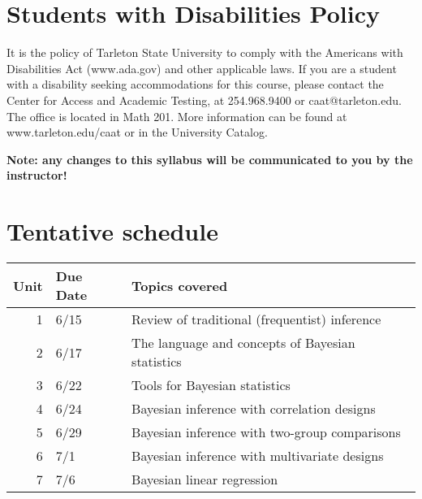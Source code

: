 \documentclass[10pt]{article}
\begin{document}
\section*{Students with Disabilities Policy}
\label{sec:orga1238df}

It is the policy of Tarleton State University to comply with the Americans with Disabilities  Act (www.ada.gov) and other applicable laws.  If you are a student with a disability seeking accommodations for this course, please contact the Center for Access and Academic Testing, at 254.968.9400 or caat@tarleton.edu. The office is located in Math 201. More information can be found at www.tarleton.edu/caat or in the University Catalog.​

\textbf{Note:  any changes to this syllabus will be communicated to you by the instructor!}

\section*{Tentative schedule}
\label{sec:org410038b}

\begin{center}
\begin{tabular}{rll}
Unit & Due Date & Topics covered\\
\hline
1 & 6/15 & Review of traditional (frequentist) inference\\
2 & 6/17 & The language and concepts of Bayesian statistics\\
3 & 6/22 & Tools for Bayesian statistics\\
4 & 6/24 & Bayesian inference with correlation designs\\
5 & 6/29 & Bayesian inference with two-group comparisons\\
6 & 7/1 & Bayesian inference with multivariate designs\\
7 & 7/6 & Bayesian linear regression\\
\end{tabular}
\end{center}
\end{document}
